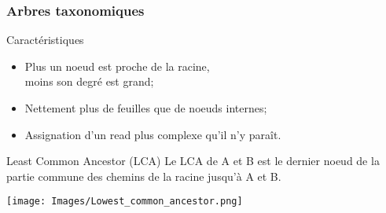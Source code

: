 \documentclass{beamer}
\begin{document}
\begin{frame}
\frametitle{Arbres taxonomiques}

\begin{block}{Caractéristiques}
\begin{itemize}
\item Plus un noeud est proche de la racine, \\moins son degré est grand;
\item Nettement plus de feuilles que de noeuds internes;
\item Assignation d'un \alert{read} plus complexe qu'il n'y paraît.
\end{itemize}
\end{block}

\end{frame}

\begin{frame}

\begin{alertblock}{Least Common Ancestor (LCA)}
Le LCA de A et B est le dernier noeud de la partie commune des chemins de la racine jusqu'à A et B.
\end{alertblock}

\bigskip

\begin{center}
\texttt{[image: Images/Lowest\_common\_ancestor.png]}
\end{center}

\end{frame}
\end{document}
